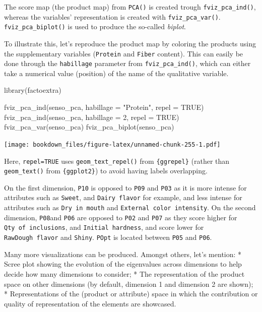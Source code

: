 \documentclass[
]{krantz}
\makeatletter
\newenvironment{Shaded}{\begin{snugshade}}{\end{snugshade}}
\newcommand{\AttributeTok}[1]{\textcolor[rgb]{0.61,0.61,0.61}{#1}}
\newcommand{\ConstantTok}[1]{\textcolor[rgb]{0,0,0}{#1}}
\newcommand{\DecValTok}[1]{\textcolor[rgb]{0.06,0.06,0.06}{#1}}
\newcommand{\FunctionTok}[1]{\textcolor[rgb]{0,0,0}{#1}}
\newcommand{\NormalTok}[1]{#1}
\newcommand{\StringTok}[1]{\textcolor[rgb]{0.5,0.5,0.5}{#1}}
\renewenvironment{quote}{\begin{VF}}{\end{VF}}
\newenvironment{kframe}{%
\medskip{}
\setlength{\fboxsep}{.8em}
 \def\at@end@of@kframe{}%
 \ifinner\ifhmode%
  \def\at@end@of@kframe{\end{minipage}}%
  \begin{minipage}{\columnwidth}%
 \fi\fi%
 \def\FrameCommand##1{\hskip\@totalleftmargin \hskip-\fboxsep
 \colorbox{shadecolor}{##1}\hskip-\fboxsep
     \hskip-\linewidth \hskip-\@totalleftmargin \hskip\columnwidth}%
 \MakeFramed {\advance\hsize-\width
   \@totalleftmargin\z@ \linewidth\hsize
   \@setminipage}}%
 {\par\unskip\endMakeFramed%
 \at@end@of@kframe}
\renewenvironment{Shaded}{\begin{kframe}}{\end{kframe}}
\makeatother
\begin{document}
The score map (the product map) from \texttt{PCA()} is created trough \texttt{fviz\_pca\_ind()}, whereas the variables' representation is created with \texttt{fviz\_pca\_var()}. \texttt{fviz\_pca\_biplot()} is used to produce the so-called \emph{biplot}.

To illustrate this, let's reproduce the product map by coloring the products using the supplementary variables (\texttt{Protein} and \texttt{Fiber} content). This can easily be done through the \texttt{habillage} parameter from \texttt{fviz\_pca\_ind()}, which can either take a numerical value (position) of the name of the qualitative variable.

\begin{Shaded}
\begin{Highlighting}[]
\FunctionTok{library}\NormalTok{(factoextra)}

\FunctionTok{fviz\_pca\_ind}\NormalTok{(senso\_pca, }\AttributeTok{habillage =} \StringTok{"Protein"}\NormalTok{, }\AttributeTok{repel =} \ConstantTok{TRUE}\NormalTok{)}
\FunctionTok{fviz\_pca\_ind}\NormalTok{(senso\_pca, }\AttributeTok{habillage =} \DecValTok{2}\NormalTok{, }\AttributeTok{repel =} \ConstantTok{TRUE}\NormalTok{)}
\FunctionTok{fviz\_pca\_var}\NormalTok{(senso\_pca)}
\FunctionTok{fviz\_pca\_biplot}\NormalTok{(senso\_pca)}
\end{Highlighting}
\end{Shaded}

\texttt{[image: bookdown\_files/figure-latex/unnamed-chunk-255-1.pdf]}

Here, \texttt{repel=TRUE} uses \texttt{geom\_text\_repel()} from \texttt{\{ggrepel\}} (rather than \texttt{geom\_text()} from \texttt{\{ggplot2\}}) to avoid having labels overlapping.

On the first dimension, \texttt{P10} is opposed to \texttt{P09} and \texttt{P03} as it is more intense for attributes such as \texttt{Sweet}, and \texttt{Dairy\ flavor} for example, and less intense for attributes such as \texttt{Dry\ in\ mouth} and \texttt{External\ color\ intensity}. On the second dimension, \texttt{P08}and \texttt{P06} are opposed to \texttt{P02} and \texttt{P07} as they score higher for \texttt{Qty\ of\ inclusions}, and \texttt{Initial\ hardness}, and score lower for \texttt{RawDough\ flavor} and \texttt{Shiny}. \texttt{POpt} is located between \texttt{P05} and \texttt{P06}.

\begin{quote}
Many more visualizations can be produced. Amongst others, let's mention:
* Scree plot showing the evolution of the eigenvalues across dimensions to help decide how many dimensions to consider;
* The representation of the product space on other dimensions (by default, dimension 1 and dimension 2 are shown);
* Representations of the (product or attribute) space in which the contribution or quality of representation of the elements are showcased.
\end{quote}
\end{document}
